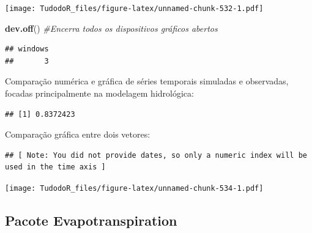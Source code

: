 \documentclass[
]{book}
\newenvironment{Shaded}{\begin{snugshade}}{\end{snugshade}}
\newcommand{\CommentTok}[1]{\textcolor[rgb]{0.56,0.35,0.01}{\textit{#1}}}
\newcommand{\DataTypeTok}[1]{\textcolor[rgb]{0.13,0.29,0.53}{#1}}
\newcommand{\KeywordTok}[1]{\textcolor[rgb]{0.13,0.29,0.53}{\textbf{#1}}}
\newcommand{\NormalTok}[1]{#1}
\newcommand{\OperatorTok}[1]{\textcolor[rgb]{0.81,0.36,0.00}{\textbf{#1}}}
\begin{document}
\texttt{[image: TudodoR\_files/figure-latex/unnamed-chunk-532-1.pdf]}

\begin{Shaded}
\begin{Highlighting}[]
\KeywordTok{dev.off}\NormalTok{() }\CommentTok{#Encerra todos os dispositivos gráficos abertos}
\end{Highlighting}
\end{Shaded}

\begin{verbatim}
## windows 
##       3
\end{verbatim}

Comparação numérica e gráfica de séries temporais simuladas e observadas, focadas principalmente na modelagem hidrológica:

\begin{Shaded}
\end{Shaded}

\begin{verbatim}
## [1] 0.8372423
\end{verbatim}

Comparação gráfica entre dois vetores:

\begin{Shaded}
\end{Shaded}

\begin{verbatim}
## [ Note: You did not provide dates, so only a numeric index will be used in the time axis ]
\end{verbatim}

\texttt{[image: TudodoR\_files/figure-latex/unnamed-chunk-534-1.pdf]}

\hypertarget{pacote-evapotranspiration}{%
\subsection{Pacote Evapotranspiration}\label{pacote-evapotranspiration}}
\end{document}

